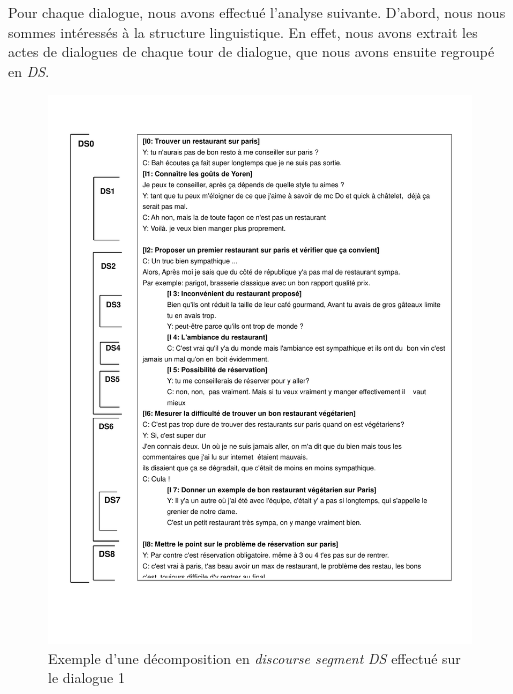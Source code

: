 			 Pour chaque dialogue, nous avons effectué l'analyse suivante. 
			 D'abord, nous nous sommes intéressés à la structure linguistique. En effet, nous avons extrait les actes de dialogues de chaque tour de dialogue, que nous avons ensuite regroupé en \emph{DS}. 
			 \begin{figure}[!h]
				\includegraphics[width=5in]{Figures/YC_DSP.pdf}
				\caption{\label{fig:DSP2} Exemple d'une décomposition en \emph{discourse segment} \emph{DS} effectué sur le dialogue 1}
			\end{figure} 
		
